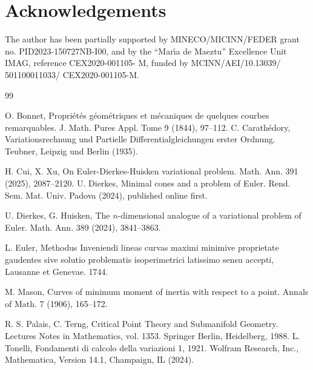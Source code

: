\documentclass[a4paper,12pt]{amsart}
\theoremstyle{definition}
\begin{document}
\section*{Acknowledgements}
The author  has been partially supported by MINECO/MICINN/FEDER grant no. PID2023-150727NB-I00,  and by the ``Mar\'{\i}a de Maeztu'' Excellence Unit IMAG, reference CEX2020-001105- M, funded by MCINN/AEI/10.13039/ 501100011033/ CEX2020-001105-M.
\begin{thebibliography}{99}
 
  O. Bonnet, Propri\'et\'es g\'eom\'etriques et m\'ecaniques de quelques courbes remarquables. 
J. Math. Pures Appl. Tome 9 (1844),  97--112.
  C. Carath\'edory, Variationsrechnung und Partielle Differentialgleichungen erster Ordnung. Teubner, Leipzig und Berlin (1935).
 
  H. Cui, X. Xu, On Euler-Dierkes-Huisken variational problem. Math. Ann. 391 (2025), 2087--2120.
  U. Dierkes, Minimal cones and a problem of Euler.  Rend. Sem. Mat. Univ. Padova (2024), published online first.


   U. Dierkes,  G. Huisken,
The $n$-dimensional analogue of a variational problem of Euler. Math. Ann. 389 (2024), 3841--3863.

 

 L. Euler, Methodus Inveniendi lineas curvas maximi minimive proprietate gaudentes sive solutio problematis isoperimetrici latissimo sensu accepti, Lausanne et Genevae. 1744.

 M. Mason, Curves of minimum moment of inertia with respect to a point. Annals of Math. 7 (1906), 165--172. 

 R.  S. Palais, C.  Terng, Critical Point Theory and Submanifold Geometry. Lectures Notes in Mathematics, vol. 1353. Springer Berlin, Heidelberg, 1988.
  L. Tonelli, Fondamenti di calcolo della variazioni 1, 1921.
 Wolfram Research, Inc., Mathematica, Version 14.1, Champaign, IL (2024).
\end{thebibliography}
\end{document}
